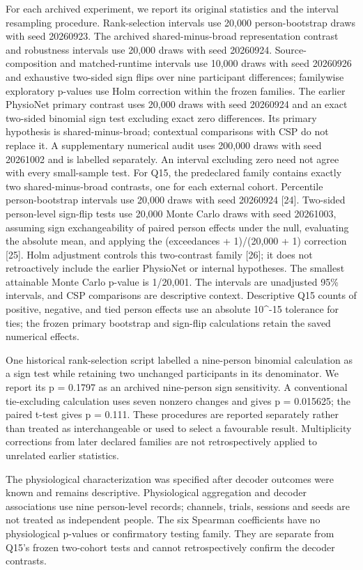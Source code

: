 \documentclass[11pt]{article}
\begin{document}
For each archived experiment, we report its original statistics and the interval resampling procedure. Rank-selection intervals use 20,000 person-bootstrap draws with seed 20260923. The archived shared-minus-broad representation contrast and robustness intervals use 20,000 draws with seed 20260924. Source-composition and matched-runtime intervals use 10,000 draws with seed 20260926 and exhaustive two-sided sign flips over nine participant differences; familywise exploratory p-values use Holm correction within the frozen families. The earlier PhysioNet primary contrast uses 20,000 draws with seed 20260924 and an exact two-sided binomial sign test excluding exact zero differences. Its primary hypothesis is shared-minus-broad; contextual comparisons with CSP do not replace it. A supplementary numerical audit uses 200,000 draws with seed 20261002 and is labelled separately. An interval excluding zero need not agree with every small-sample test. For Q15, the predeclared family contains exactly two shared-minus-broad contrasts, one for each external cohort. Percentile person-bootstrap intervals use 20,000 draws with seed 20260924 [24]. Two-sided person-level sign-flip tests use 20,000 Monte Carlo draws with seed 20261003, assuming sign exchangeability of paired person effects under the null, evaluating the absolute mean, and applying the (exceedances + 1)/(20,000 + 1) correction [25]. Holm adjustment controls this two-contrast family [26]; it does not retroactively include the earlier PhysioNet or internal hypotheses. The smallest attainable Monte Carlo p-value is 1/20,001. The intervals are unadjusted 95\% intervals, and CSP comparisons are descriptive context. Descriptive Q15 counts of positive, negative, and tied person effects use an absolute 10\textasciicircum{}-15 tolerance for ties; the frozen primary bootstrap and sign-flip calculations retain the saved numerical effects.

One historical rank-selection script labelled a nine-person binomial calculation as a sign test while retaining two unchanged participants in its denominator. We report its p = 0.1797 as an archived nine-person sign sensitivity. A conventional tie-excluding calculation uses seven nonzero changes and gives p = 0.015625; the paired t-test gives p = 0.111. These procedures are reported separately rather than treated as interchangeable or used to select a favourable result. Multiplicity corrections from later declared families are not retrospectively applied to unrelated earlier statistics.

The physiological characterization was specified after decoder outcomes were known and remains descriptive. Physiological aggregation and decoder associations use nine person-level records; channels, trials, sessions and seeds are not treated as independent people. The six Spearman coefficients have no physiological p-values or confirmatory testing family. They are separate from Q15's frozen two-cohort tests and cannot retrospectively confirm the decoder contrasts.
\end{document}
